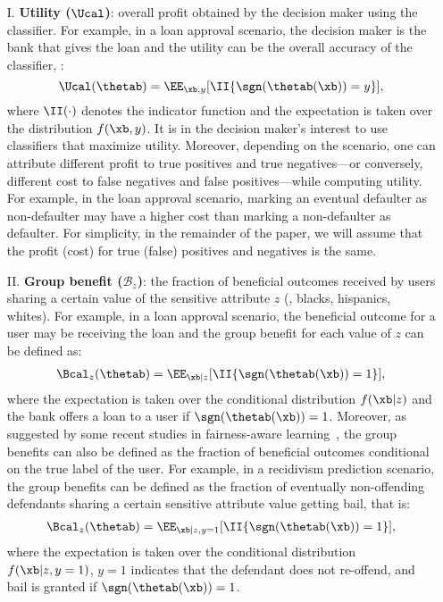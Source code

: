 \documentclass{article}
\newcommand{\xytup}{\xb,y}
\begin{document}
\vspace{-2mm}
\begin{itemize}[leftmargin=6mm]
\item[I.] \textbf{Utility ($\Ucal$)}:
overall profit obtained by the decision maker using the classifier. For example, in a loan approval scenario, the decision maker is the bank that gives the loan and the utility can be
the overall accuracy of the classifier, \ie:
\begin{equation}
\Ucal(\thetab)
=
\EE_{\xytup} [\II\{\sgn(\thetab(\xb)) = y\}], \nonumber
\end{equation}
where $\II(\cdot)$ denotes the indicator function and the expectation is taken over the distribution $f(\xytup)$.
It is in the decision maker'{}s interest to use classifiers that maximize utility. Moreover, depending on the scenario, one can attribute different profit to true positives and true negatives---or conversely,
different cost to false negatives and false positives---while computing utility. For example, in the loan approval scenario, marking an eventual defaulter as non-defaulter may have a higher cost
than marking a non-defaulter as defaulter. For simplicity, in the remainder of the paper, we will assume that the profit (cost) for true (false) positives and negatives is the same.

\item[II.] \textbf{Group benefit ($\mathcal{B}_z$)}:
the fraction of beneficial outcomes received by users sharing a certain value of the sensitive attribute $z$ (\eg, blacks, hispanics, whites). For example, in a loan approval scenario, the beneficial outcome for a user may be receiving the loan and the group benefit for each value of $z$ can be defined as:
\begin{align}
\Bcal_z(\thetab)
=
\EE_{\xb | z} [\II\{\sgn(\thetab(\xb)) = 1\}], \nonumber
\end{align}
where the expectation is taken over the conditional distribution $f(\xb | z)$ and the bank offers a loan to a user if $\sgn(\thetab(\xb)) = 1$.
Moreover, as suggested by some recent studies in fairness-aware learning~\cite{hardt_nips16,kleinberg_itcs17,zafar_dmt}, the group benefits can also be defined as the fraction of beneficial outcomes conditional on the true label of the user. For example,
in a recidivism prediction scenario, the group benefits can be defined as the fraction of eventually non-offending defendants sharing a certain sensitive attribute value getting bail, that is:
\begin{align}
\Bcal_z(\thetab)
=
\EE_{\xb | z, y=1} [\II\{\sgn(\thetab(\xb)) = 1\}], \nonumber
\end{align}
where the expectation is taken over the conditional distribution $f(\xb | z, y=1)$, $y=1$ indicates that the defendant does not re-offend, and bail is granted
if $\sgn(\thetab(\xb)) = 1$.
\end{itemize}
\end{document}
